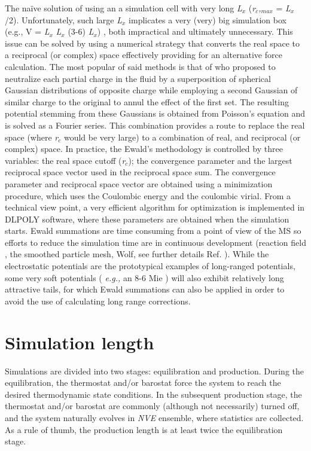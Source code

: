 \documentclass{scrbook}
\begin{document}
The na\"{i}ve solution of using an a simulation cell with very long
\textit{L}$_{x}$ (\textit{r}$_{c}$\textit{,}$_{max}$ = \textit{L}$_{x}$/2).
Unfortunately, such large \textit{L}$_{x}$ implicates a very (very) big
simulation box (e.g., V = \textit{L}$_{x}$ \textit{L}$_{x}$ (3-6)
\textit{L}$_{x}$) , both impractical and ultimately unnecessary. This issue can
be solved by using a numerical strategy that converts the real space to
a reciprocal (or complex) space effectively providing for an alternative force
calculation.  The most popular of said methods is that of \citet{ewald1921}
who proposed to neutralize
each partial charge in the fluid by a superposition of spherical Gaussian
distributions of opposite charge while employing a second Gaussian of similar
charge to the original to annul the effect of the first set. The resulting
potential stemming from these Gaussians is obtained from Poisson's equation and
is solved as a Fourier series. This combination provides a route to replace the
real space (where \textit{r}$_{c}$ would be very large) to a combination of
real, and reciprocal (or complex) space. In practice, the Ewald's methodology
is controlled by three variables: the real space cutoff (\textit{r}$_{c}$); the
convergence parameter and the largest reciprocal space vector used in the
reciprocal space sum. The convergence parameter and reciprocal space vector are
obtained using a minimization procedure, which uses the Coulombic energy and
the coulombic virial. From a technical view point, a very efficient algorithm
for optimization is implemented in DLPOLY software, where these parameters are
obtained when the simulation starts. Ewald summations are time consuming from
a point of view of the MS so efforts to reduce the simulation time are in
continuous development (reaction field \citep{barker1973,watts1974},
the smoothed particle mesh\citep{darden1993},
Wolf\citep{wolf1999}, see further details Ref. \citep{allen2017}).
While the electrostatic potentials are the
prototypical examples of long-ranged potentials, some very soft potentials
( \textit{e.g.,} an 8-6 Mie ) will also exhibit relatively long attractive
tails, for which Ewald summations can also be applied in order to avoid the use
of calculating long range corrections\citep{kissel}.

\section{Simulation length} 
Simulations are divided into two stages: equilibration and production. During
the equilibration, the thermostat and/or barostat force the system to reach the
desired thermodynamic state conditions. In the subsequent production stage, the
thermostat and/or barostat are commonly (although not necessarily) turned off,
and the system naturally evolves in \textit{NVE} ensemble, where statistics are
collected. As a rule of thumb, the production length is at least twice the
equilibration stage. 
\end{document}
